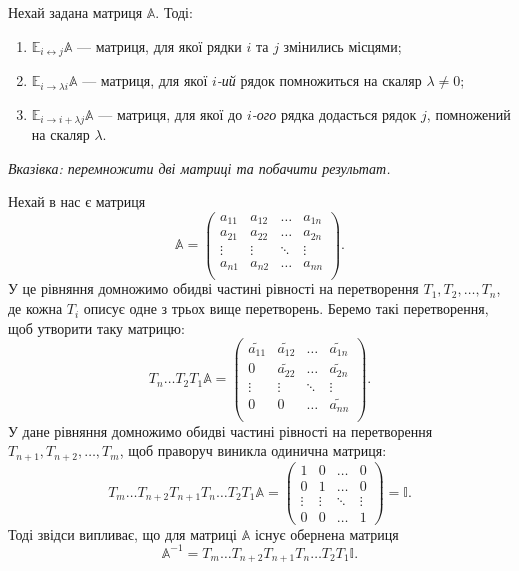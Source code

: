 \documentclass{math_library}
\begin{document}
\begin{proposition}
Нехай задана матриця $\mathbb{A}$. Тоді:
\begin{enumerate}[nosep, label={\arabic*)}, wide=0pt]
	\item $\mathbb{E}_{i \leftrightarrow j}\mathbb{A}$ --- матриця, для якої рядки $i$ та $j$ змінились місцями;
	\item $\mathbb{E}_{i \rightarrow \lambda i}\mathbb{A}$ --- матриця, для якої $i$\textit{-ий} рядок помножиться на скаляр $\lambda \neq 0$;
	\item $\mathbb{E}_{i \rightarrow i + \lambda j}\mathbb{A}$ --- матриця, для якої до $i$\textit{-ого} рядка додасться рядок $j$, помножений на скаляр $\lambda$.
\end{enumerate}
	\textit{Вказівка: перемножити дві матриці та побачити результат.}
\end{proposition}
\noindent
Нехай в нас є матриця
\[
\mathbb{A} = \begin{pmatrix}
a_{11} & a_{12} & \dots & a_{1n} \\
a_{21} & a_{22} & \dots & a_{2n} \\
\vdots & \vdots & \ddots & \vdots \\
a_{n1} & a_{n2} & \dots & a_{nn} \\
\end{pmatrix}.
\]
У це рівняння домножимо обидві частині рівності на перетворення $T_1,T_2, \dots, T_n$, де кожна $T_i$ описує одне з трьох вище перетворень. Беремо такі перетворення, щоб утворити таку матрицю:
\[
T_n \dots T_2 T_1 \mathbb{A} = \begin{pmatrix}
\widetilde{a_{11}} & \widetilde{a_{12}} & \dots & \widetilde{a_{1n}} \\
0 & \widetilde{a_{22}} & \dots & \widetilde{a_{2n}} \\
\vdots & \vdots & \ddots & \vdots \\
0 & 0 & \dots & \widetilde{a_{nn}} \\
\end{pmatrix}.
\]
У дане рівняння домножимо обидві частині рівності на перетворення $T_{n+1}, T_{n+2},\dots, T_m$, щоб праворуч виникла одинична матриця:
\[
T_m \dots T_{n+2} T_{n+1} T_n \dots T_2 T_1 \mathbb{A} = \begin{pmatrix}
1 & 0 & \dots & 0 \\
0 & 1 & \dots & 0 \\
\vdots & \vdots & \ddots & \vdots \\
0 & 0 & \dots & 1
\end{pmatrix} = \mathbb{I}.
\]
Тоді звідси випливає, що для матриці $\mathbb{A}$ існує обернена матриця 
\[
\mathbb{A}^{-1} = T_m \dots T_{n+2} T_{n+1} T_n \dots T_2 T_1 \mathbb{I}.
\]
\end{document}
